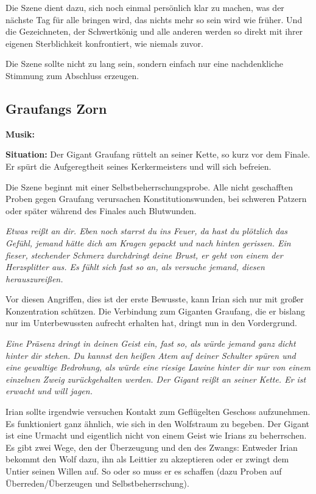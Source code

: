 Die Szene dient dazu, sich noch einmal persönlich klar zu machen, was der nächste Tag für alle bringen wird, das nichts mehr so sein wird wie früher. Und die Gezeichneten, der Schwertkönig und alle anderen werden so direkt mit ihrer eigenen Sterblichkeit konfrontiert, wie niemals zuvor. 

Die Szene sollte nicht zu lang sein, sondern einfach nur eine nachdenkliche Stimmung zum Abschluss erzeugen.

\subsection{Graufangs Zorn}

\textbf{Musik:}

\textbf{Situation:} Der Gigant Graufang rüttelt an seiner Kette, so kurz vor dem Finale. Er spürt die Aufgeregtheit seines Kerkermeisters und will sich befreien.

Die Szene beginnt mit einer Selbstbeherrschungsprobe. Alle nicht geschafften Proben gegen Graufang verursachen Konstitutionswunden, bei schweren Patzern oder später während des Finales auch Blutwunden.

\emph{Etwas reißt an dir. Eben noch starrst du ins Feuer, da hast du plötzlich das Gefühl, jemand hätte dich am Kragen gepackt und nach hinten gerissen. Ein fieser, stechender Schmerz durchdringt deine Brust, er geht von einem der Herzsplitter aus. Es fühlt sich fast so an, als versuche jemand, diesen herauszureißen.}

Vor diesen Angriffen, dies ist der erste Bewusste, kann Irian sich nur mit großer Konzentration schützen. Die Verbindung zum Giganten Graufang, die er bislang nur im Unterbewussten aufrecht erhalten hat, dringt nun in den Vordergrund.

\emph{Eine Präsenz dringt in deinen Geist ein, fast so, als würde jemand ganz dicht hinter dir stehen. Du kannst den heißen Atem auf deiner Schulter spüren und eine gewaltige Bedrohung, als würde eine riesige Lawine hinter dir nur von einem einzelnen Zweig zurückgehalten werden. Der Gigant reißt an seiner Kette. Er ist erwacht und will jagen.}

Irian sollte irgendwie versuchen Kontakt zum Geflügelten Geschoss aufzunehmen. Es funktioniert ganz ähnlich, wie sich in den Wolfstraum zu begeben. Der Gigant ist eine Urmacht und eigentlich nicht von einem Geist wie Irians zu beherrschen. Es gibt zwei Wege, den der Überzeugung und den des Zwangs: Entweder Irian bekommt den Wolf dazu, ihn als Leittier zu akzeptieren oder er zwingt dem Untier seinen Willen auf. So oder so muss er es schaffen (dazu Proben auf Überreden/Überzeugen und Selbstbeherrschung).


